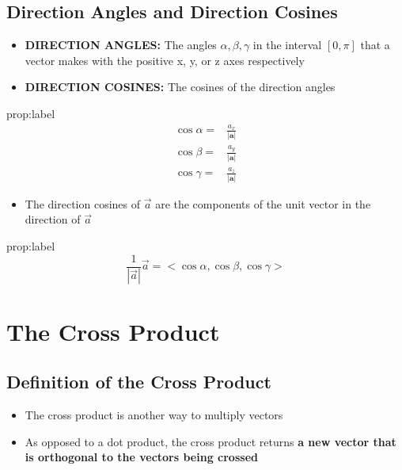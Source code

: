 \documentclass{package/notes}
\begin{document}
\subsection{Direction Angles and Direction Cosines}

	\begin{itemize}
		\item \textbf{DIRECTION ANGLES:} The angles $\alpha, \beta, \gamma$ in the interval $[0,\pi]$ that a vector makes with the positive x, y, or z axes respectively
		\item \textbf{DIRECTION COSINES:} The cosines of the direction angles
	\end{itemize}

	\begin{proposition}{prop:label}
		$$
		\begin{aligned}
			\cos \alpha =& \frac{a_x}{|\mathbf{a}|}\\
			\cos \beta =& \frac{a_y}{|\mathbf a|}\\
			\cos \gamma =& \frac{a_z}{|\mathbf a|}
		\end{aligned}
		$$
	\end{proposition}

	\begin{itemize}
		\item The direction cosines of $\vec a$ are the components of the unit vector in the direction of $\vec a$ 
	\end{itemize}

	\begin{proposition}{prop:label}
		$$\frac{1}{|\vec a|}\vec a = <\cos\alpha, \cos\beta, \cos\gamma>$$
	\end{proposition}

\section{The Cross Product}

\subsection{Definition of the Cross Product}

	\begin{itemize}
		\item The cross product is another way to multiply vectors
		\item As opposed to a dot product, the cross product returns \textbf{a new vector that is orthogonal to the vectors being crossed}
	\end{itemize}
\end{document}
